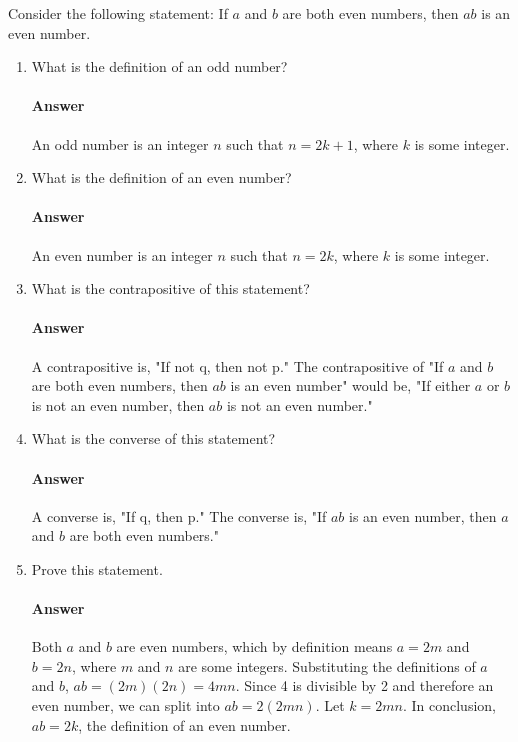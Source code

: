 \documentclass{article}
\begin{document}
Consider the following statement: If $a$ and $b$ are both even numbers, then $ab$ is
an even number.
\begin{enumerate}
    \item What is the definition of an odd number?

        \paragraph{Answer}{An odd number is an integer $n$ such that $n = 2k + 1$, where $k$ is some integer.}

    \item What is the definition of an even number?

        \paragraph{Answer}{An even number is an integer $n$ such that $n = 2k$, where $k$ is some integer.}

    \item What is the contrapositive of this statement?

        \paragraph{Answer}{A contrapositive is, "If not q, then not p." The contrapositive of "If $a$ and $b$ are both even numbers, then $ab$ is an even number" would be, "If either $a$ or $b$ is not an even number, then $ab$ is not an even number."}

    \item What is the converse of this statement?

        \paragraph{Answer}{A converse is, "If q, then p." The converse is, "If $ab$ is an even number, then $a$ and $b$ are both even numbers."}

    \item Prove this statement.

        \paragraph{Answer}{Both $a$ and $b$ are even numbers, which by definition means $a = 2m$ and $b = 2n$, where $m$ and $n$ are some integers. Substituting the definitions of $a$ and $b$, $ab = (2m)(2n) = 4mn$. Since 4 is divisible by 2 and therefore an even number, we can split into $ab = 2(2mn)$. Let $k = 2mn$. In conclusion, $ab = 2k$, the definition of an even number.}

\end{enumerate}
\end{document}
